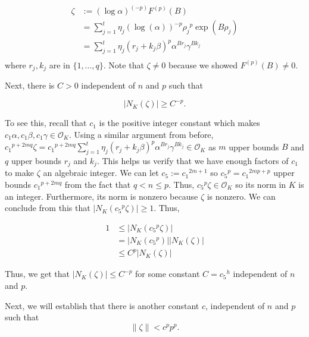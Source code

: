 \documentclass[a4paper, 11pt]{book}
\begin{document}
\begin{align*}
    \zeta &:= {(\log \alpha)}^{(-p)}F^{(p)}(B) \\
          &= \sum\limits_{j=1}^{t}\eta_{j}{\left(\log(\alpha)\right)}^{-p}{\rho_{j}}^{p}\exp(B\rho_j) \\
          &= \sum\limits_{j=1}^{t} \eta_{j}{\left(r_j + k_j \beta\right)}^{p}{\alpha}^{Br_{j}}{\gamma}^{Bk_{j}} \\
\end{align*}
where $r_j, k_j$ are in $\{1, \ldots, q\}$. Note that $\zeta \neq 0$ because we showed $F^{(p)}(B) \neq 0$.\par

Next, there is $C > 0$ independent of $n$ and $p$ such that 

\[\vert N_{K}(\zeta) \vert \geq C^{-p}.\]

To see this, recall that $c_1$ is the positive integer constant which makes $c_1\alpha, c_1\beta, c_1\gamma \in \mathcal{O}_K$. Using a similar argument from before, ${c_1}^{p+2mq} \zeta = {c_1}^{p + 2mq}\sum\limits_{j=1}^{t}{\eta_{j}\left(r_j + k_j \beta\right)}^{p}{\alpha}^{Br_{j}}{\gamma}^{Bk_{j}} \in \mathcal{O}_K$ as $m$ upper bounds $B$ and $q$ upper bounds $r_j$ and $k_j$. This helps us verify that we have enough factors of $c_1$ to make $\zeta$ an algebraic integer. We can let $c_5 := {c_1}^{2m+1}$ so ${c_5}^p = {c_1}^{2mp + p}$ upper bounds ${c_1}^{p + 2mq}$ from the fact that $q < n \leq p$. Thus, ${c_5}^{p}\zeta \in \mathcal{O}_K$ so its norm in $K$ is an integer. Furthermore, its norm is nonzero because $\zeta$ is nonzero.  We can conclude from this that $\vert N_K({c_5}^{p}\zeta) \vert \geq 1$. Thus,

\begin{align*}
    1 &\leq \vert N_K({c_5}^{p}\zeta) \vert \\
      &= \vert N_K({c_5}^{p}) \vert \vert N_K(\zeta) \vert \\
      & \leq C^{p}\vert N_K(\zeta) \vert
\end{align*}

Thus, we get that $\vert N_K(\zeta) \vert \leq C^{-p}$ for some constant $C = {c_5}^{h}$ independent of $n$ and $p$.\par

Next, we will establish that there is another constant $c$, independent of $n$ and $p$ such that \[\| \zeta \| < c^{p}p^{p}.\]
\end{document}
